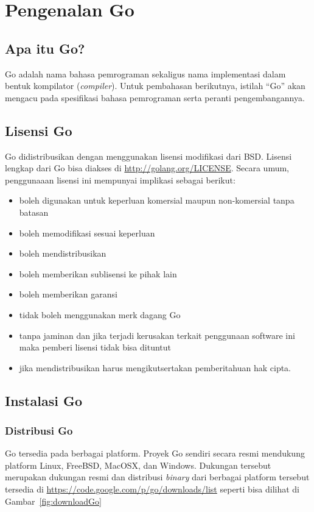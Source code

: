 \chapter{Pengenalan Go}

\section{Apa itu Go?}

Go adalah nama bahasa pemrograman sekaligus nama implementasi dalam bentuk kompilator (\textit{compiler}). Untuk pembahasan berikutnya, istilah ``Go'' akan mengacu pada spesifikasi bahasa pemrograman serta peranti pengembangannya.

\section{Lisensi Go}

Go didistribusikan dengan menggunakan lisensi modifikasi dari BSD. Lisensi lengkap dari Go bisa diakses di \url{http://golang.org/LICENSE}. Secara umum, penggunaaan lisensi ini mempunyai implikasi sebagai berikut:
\begin{itemize}
\item boleh digunakan untuk keperluan komersial maupun non-komersial tanpa batasan
\item boleh memodifikasi sesuai keperluan
\item boleh mendistribusikan
\item boleh memberikan sublisensi ke pihak lain
\item boleh memberikan garansi
\item tidak boleh menggunakan merk dagang Go
\item tanpa jaminan dan jika terjadi kerusakan terkait penggunaan software ini maka pemberi lisensi tidak bisa dituntut
\item jika mendistribusikan harus mengikutsertakan pemberitahuan hak cipta.
\end{itemize}

\section{Instalasi Go}

\subsection{Distribusi Go}

Go tersedia pada berbagai platform. Proyek Go sendiri secara resmi mendukung platform Linux, FreeBSD, MacOSX, dan Windows. Dukungan tersebut merupakan dukungan resmi dan distribusi \textit{binary} dari berbagai platform tersebut tersedia di \url{https://code.google.com/p/go/downloads/list} seperti bisa dilihat di Gambar~\ref{fig:downloadGo}

